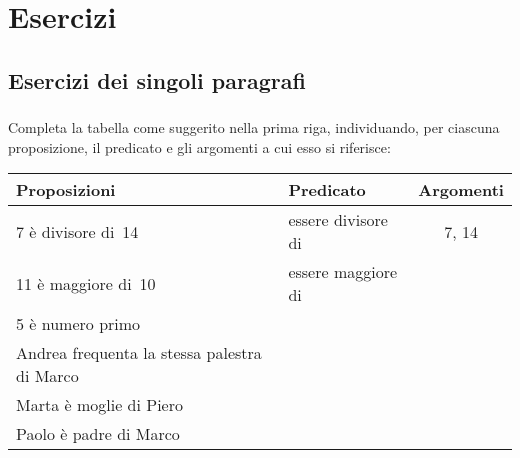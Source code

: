 
\section{Esercizi}
\subsection{Esercizi dei singoli paragrafi}
\subsubsection*{}

\begin{esercizio}
\label{ese:B.1}
Completa la tabella come suggerito nella prima riga, individuando, per 
ciascuna proposizione, il predicato e gli argomenti a cui esso si riferisce:
\begin{center}
\begin{tabular}{llc}
\toprule
Proposizioni & Predicato & Argomenti\\
\midrule
7 è divisore di~14 & essere divisore di & 7, 14 \\
11 è maggiore di~10 & essere maggiore di & \\
5 è numero primo & & \\
Andrea frequenta la stessa palestra di Marco & & \\
Marta è moglie di Piero & & \\
Paolo è padre di Marco & & \\
\bottomrule
\end{tabular}
\end{center}
\end{esercizio}

\subsubsection*{}

